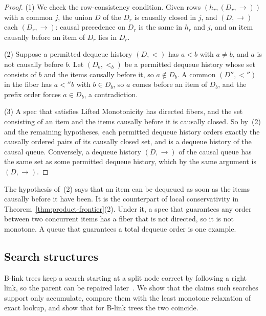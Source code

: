 \begin{proof}
(1) We check the row-consistency condition.  Given rows $(h_r,(D_r,\to))$
with a common \indesc $j$, the union $D$ of the $D_r$ is causally closed in
$j$, and $(D,\to)$ \outrel each $(D_r,\to)$: causal precedence on $D_r$ is the
same in $h_r$ and $j$, and an item causally before an item of $D_r$ lies in
$D_r$.

(2) Suppose a permitted dequeue history $(D,<)$ has $a<b$ with $a\neq b$, and
$a$ is not causally before $b$.  Let $(D_b,<_b)$ be a permitted dequeue history
whose set consists of $b$ and the items causally before it, so
$a\notin D_b$.  A common \outnoun $(D'',<'')$ in the fiber has $a<''b$ with
$b\in D_b$, so $a$ comes before an item of $D_b$, and the prefix order forces
$a\in D_b$, a contradiction.

(3) A spec that satisfies Lifted Monotonicity has directed fibers, and the set
consisting of an item and the items causally before it is causally closed.
So by~(2) and the remaining hypotheses, each permitted dequeue history orders
exactly the causally ordered pairs of its causally closed set, and is a dequeue
history of the causal queue.  Conversely, a dequeue history $(D,\to)$ of the
causal queue has the same set as some permitted dequeue history, which by the
same argument is $(D,\to)$.
\end{proof}

The hypothesis of~(2) says that an item can be dequeued as soon as the items
causally before it have been.  It is the counterpart of local conservativity
in Theorem~\ref{thm:product-frontier}(2).  Under it, a spec that guarantees any
order between two concurrent items has a fiber that is not directed, so it is
not monotone.  A queue that guarantees a total dequeue order is one example.

\subsection{Search structures}
\label{app:search}

B-link trees keep a search starting at a split node correct by following a
right link, so the parent can be repaired later~\cite{lehman1981efficient}.  We
show that the claims such searches support only accumulate, compare them with
the least monotone relaxation of exact lookup, and show that for B-link trees
the two coincide.

